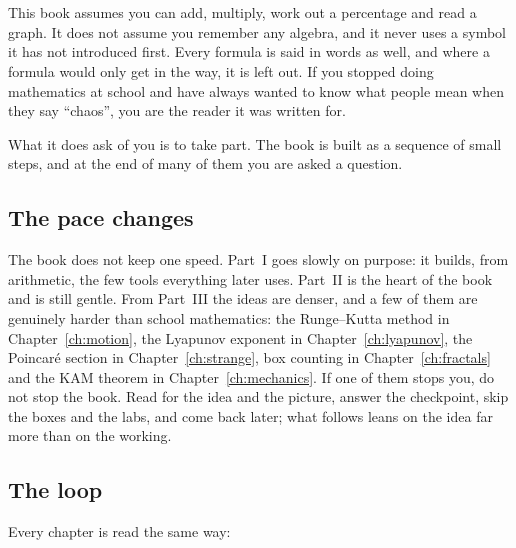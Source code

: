 
\chapter*{\lblHowToUse}
{}
\markboth{\lblHowToUse}{\lblHowToUse}

\noindent
This book assumes you can add, multiply, work out a percentage and read a
graph. It does not assume you remember any algebra, and it never uses a
symbol it has not introduced first. Every formula is said in words as well,
and where a formula would only get in the way, it is left out. If you
stopped doing mathematics at school and have always wanted to know what
people mean when they say \enquote{chaos}, you are the reader it was written
for.

What it does ask of you is to take part. The book is built as a sequence of
small steps, and at the end of many of them you are asked a question.

\section*{The pace changes}

The book does not keep one speed. Part~I goes slowly on purpose: it builds,
from arithmetic, the few tools everything later uses. Part~II is the heart of
the book and is still gentle. From Part~III the ideas are denser, and a few
of them are genuinely harder than school mathematics: the Runge--Kutta method
in Chapter~\ref{ch:motion}, the Lyapunov exponent in Chapter~\ref{ch:lyapunov},
the Poincaré section in Chapter~\ref{ch:strange}, box counting in
Chapter~\ref{ch:fractals} and the KAM theorem in Chapter~\ref{ch:mechanics}.
If one of them stops you, do not stop the book. Read for the idea and the
picture, answer the checkpoint, skip the \lblRigour{} boxes and the labs, and
come back later; what follows leans on the idea far more than on the working.

\section*{The loop}

Every chapter is read the same way:

